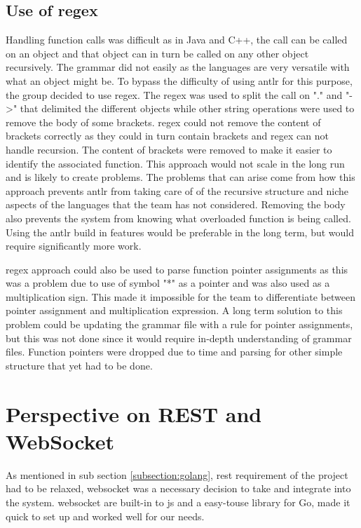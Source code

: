 \subsection{Use of regex}

Handling function calls was difficult as in Java and C++, the call can be called on an object and that object can in turn be called on any other object recursively. The grammar did not easily as the languages are very versatile with what an object might be. To bypass the difficulty of using \gls{antlr} for this purpose, the group decided to use \gls{regex}. The \gls{regex} was used to split the call on "." and "->" that delimited the different objects while other string operations were used to remove the body of some brackets. \Gls{regex} could not remove the content of brackets correctly as they could in turn contain brackets and \gls{regex} can not handle \gls{recursion}. The content of brackets were removed to make it easier to identify the associated function. This approach would not scale in the long run and is likely to create problems. The problems that can arise come from how this approach prevents \gls{antlr} from taking care of of the recursive structure and niche aspects of the languages that the team has not considered. Removing the body also prevents the system from knowing what overloaded function is being called. Using the \gls{antlr} build in features would be preferable in the long term, but would require significantly more work. 


\Gls{regex} approach could also be used to parse function pointer assignments as this was a problem due to use of symbol "*" as a pointer and was also used as a multiplication sign. This made it impossible for the team to differentiate between pointer assignment and multiplication expression. A long term solution to this problem could be updating the grammar file with a rule for pointer assignments, but this was not done since it would require in-depth understanding of grammar files. Function pointers were dropped due to time and parsing for other simple structure that yet had to be done.


\section{Perspective on REST and WebSocket}
As mentioned in sub section \ref{subsection:golang}, \gls{rest} requirement of the project had to be relaxed, \gls{websocket} was a necessary decision to take and integrate into the system. \Gls{websocket} are built-in to \gls{js} and a easy-touse library for Go, made it quick to set up and worked well for our needs.


